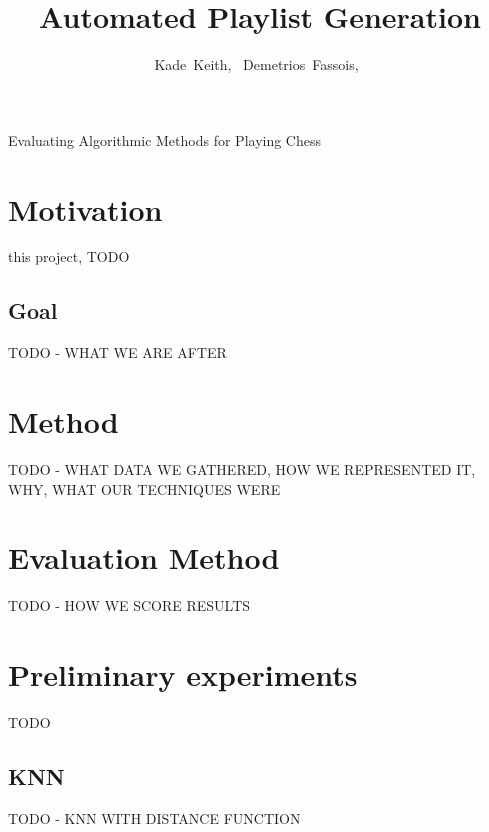 \documentclass[10pt,journal,compsoc]{IEEEtran}
\begin{document}
\title{Automated Playlist Generation\\}

\author{
  Kade~Keith,~
  Demetrios~Fassois,~
}

%
{Evaluating Algorithmic Methods for Playing Chess}


\maketitle

\section{Motivation}

 this project, TODO

\subsection{Goal}
TODO - WHAT WE ARE AFTER

\section{Method}
TODO - WHAT DATA WE GATHERED, HOW WE REPRESENTED IT, WHY, WHAT OUR TECHNIQUES WERE

\section{Evaluation Method}
TODO - HOW WE SCORE RESULTS

\section{Preliminary experiments}
TODO

\subsection{KNN}
TODO - KNN WITH DISTANCE FUNCTION
\end{document}
